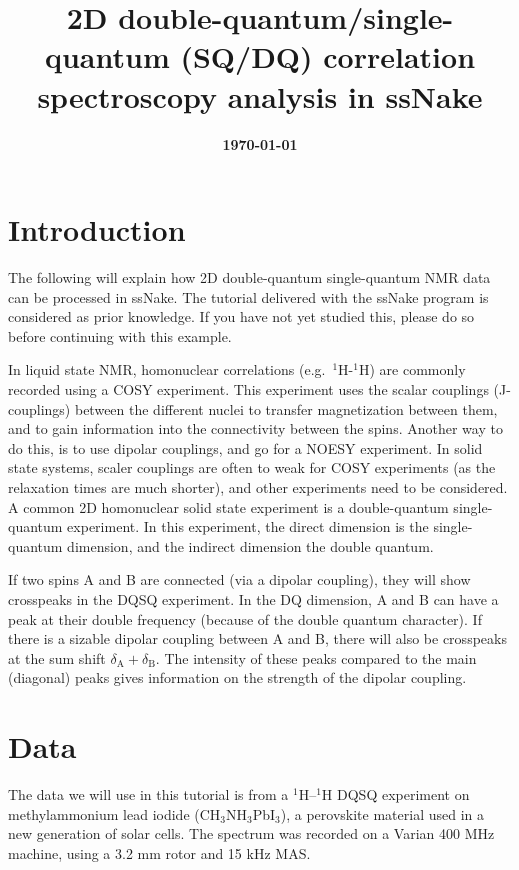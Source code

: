 \documentclass[11pt,a4paper]{article}
\title{\color{black}\fontfamily{SourceSansPro-LF}\bfseries 2D double-quantum/single-quantum (SQ/DQ)
correlation spectroscopy analysis in ssNake}
\author{}
\date{\color{black}\fontfamily{SourceSansPro-LF}\bfseries \today}
\begin{document}

\maketitle

\section{Introduction}
The following will explain how 2D double-quantum single-quantum NMR data can be processed in ssNake.
 The
tutorial delivered with the ssNake program is considered as prior knowledge. If you have not yet
studied this, please do so before continuing with this example.

In liquid state NMR, homonuclear correlations (e.g.\ $^{1}$H-$^1$H) are commonly recorded using a
COSY experiment. This experiment uses the scalar couplings (J-couplings) between the different nuclei
to transfer magnetization between them, and to gain information into the connectivity between the
spins. Another way to do this, is to use dipolar couplings, and go for a NOESY experiment. In solid
state systems, scaler couplings are often to weak for COSY experiments (as the relaxation times are
much shorter), and other experiments need to be considered. A common 2D homonuclear solid state
experiment is a double-quantum single-quantum experiment. In this experiment, the direct dimension
is the single-quantum dimension, and the indirect dimension the double quantum. 

If two spins A and B are connected (via a dipolar coupling), they will show crosspeaks in the DQSQ
experiment. In the DQ dimension, A and B can have a peak at their double frequency (because
of the double quantum character). If there is a sizable dipolar coupling between A and B, there will
also be crosspeaks at the sum shift $\delta_\text{A} + \delta_\text{B}$. The intensity of
these peaks compared to the main (diagonal) peaks gives information on the strength of the dipolar
coupling.

\section{Data}
The data we will use in this tutorial is from a $^1$H--$^1$H DQSQ experiment on methylammonium lead iodide
(CH$_3$NH$_3$PbI$_3$), a perovskite material used in a new generation of solar cells. The spectrum
was recorded on a Varian 400 MHz machine, using a 3.2 mm rotor and 15 kHz MAS.
\end{document}
